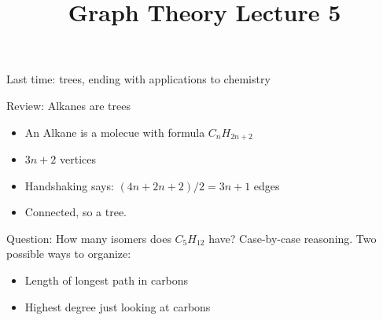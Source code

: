 \documentclass{beamer}
\title{Graph Theory Lecture 5}
\begin{document}
\begin{frame}{Last time: trees, ending with applications to chemistry}
\begin{block}{Review: Alkanes are trees}
  \begin{itemize}
 \item An Alkane is a molecue with formula $C_nH_{2n+2}$
 \item $3n+2$ vertices
 \item Handshaking says: $(4n+2n+2)/2=3n+1$ edges
   \item Connected, so a tree.
\end{itemize}
\end{block}

\begin{block}{Question: How many isomers does $C_5H_{12}$ have?}
  Case-by-case reasoning.  Two possible ways to organize:
  \begin{itemize}
  \item Length of longest path in carbons
  \item Highest degree just looking at carbons
    \end{itemize}
\end{block}
\end{frame}
\end{document}
